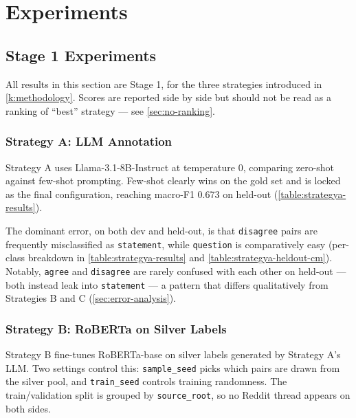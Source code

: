 \chapter{Experiments}
\label{sec:experiments}

\section{Stage 1 Experiments}

All results in this section are Stage 1, for the three strategies
introduced in \autoref{k:methodology}. Scores are reported side by side
but should not be read as a ranking of ``best'' strategy --- see
\autoref{sec:no-ranking}.

\subsection{Strategy A: LLM Annotation}

Strategy A uses Llama-3.1-8B-Instruct \parencite{touvron2023llama} at
temperature 0, comparing zero-shot against few-shot prompting. Few-shot
clearly wins on the gold set and is locked as the final configuration,
reaching macro-F1 0.673 on held-out (\autoref{table:strategya-results}).

The dominant error, on both dev and held-out, is that \texttt{disagree}
pairs are frequently misclassified as \texttt{statement}, while
\texttt{question} is comparatively easy (per-class breakdown in
\autoref{table:strategya-results} and \autoref{table:strategya-heldout-cm}).
Notably, \texttt{agree} and \texttt{disagree} are rarely confused with
each other on held-out --- both instead leak into \texttt{statement}
--- a pattern that differs qualitatively from Strategies B and C
(\autoref{sec:error-analysis}).

\subsection{Strategy B: RoBERTa on Silver Labels}

Strategy B fine-tunes RoBERTa-base on silver labels generated by
Strategy A's LLM. Two settings control this: \texttt{sample\_seed} picks
which pairs are drawn from the silver pool, and \texttt{train\_seed}
controls training randomness. The train/validation split is grouped by
\texttt{source\_root}, so no Reddit thread appears on both sides.

